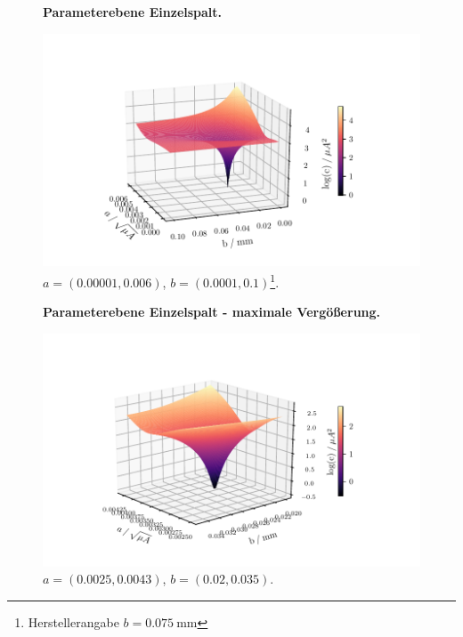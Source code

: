 \begin{figure}
    \centering
    \textbf{Parameterebene Einzelspalt.}\par\medskip
    \includegraphics[width=.9\textwidth]{python/leastSquares3.pdf}
    \caption{$a = (0.00001, 0.006)$, $b = (0.0001, 0.1)$\footnote{Herstellerangabe $b=\SI{0.075}{\milli\meter}$}.}
    \label{fig:ls3}
\end{figure}

\begin{figure}
    \centering
    \textbf{Parameterebene Einzelspalt - maximale Vergößerung.}\par\medskip
    \includegraphics[width=.9\textwidth]{python/leastSquares5.pdf}
    \caption{$a = (0.0025, 0.0043)$, $b = (0.02, 0.035)$.}
    \label{fig:ls4}
\end{figure}


